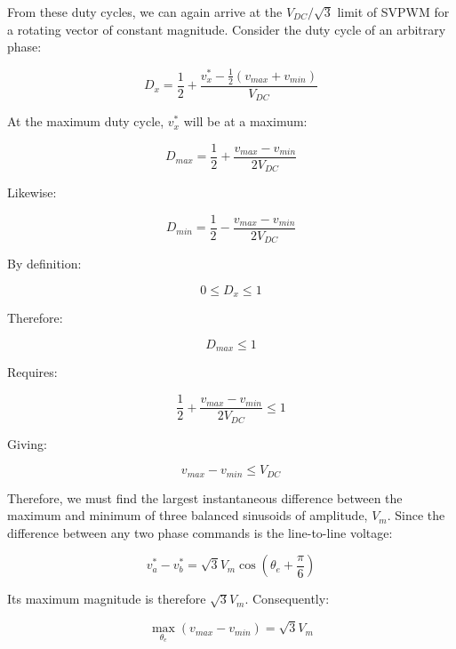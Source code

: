 \documentclass{article}
\begin{document}
From these duty cycles, we can again arrive at the $V_{DC}/\sqrt{3}$ limit of SVPWM for a rotating vector of constant magnitude. Consider the duty cycle of an arbitrary phase:

\begin{equation}
    D_x = \frac{1}{2} + \frac{v_x^* - \frac{1}{2}(v_{max} + v_{min})}{V_{DC}}
\end{equation}

At the maximum duty cycle, $v_x^*$ will be at a maximum:

\begin{equation}
    D_{max} = \frac{1}{2} + \frac{v_{max} - v_{min}}{2V_{DC}}
\end{equation}

Likewise:

\begin{equation}
    D_{min} = \frac{1}{2} - \frac{v_{max} - v_{min}}{2V_{DC}}
\end{equation}

By definition:

\begin{equation}
    0 \leq D_x \leq 1
\end{equation}

Therefore:

\begin{equation}
    D_{max} \leq 1
\end{equation}

Requires:

\begin{equation}
    \frac{1}{2} + \frac{v_{max} - v_{min}}{2V_{DC}} \leq 1
\end{equation}

Giving:

\begin{equation}
    v_{max} - v_{min} \leq V_{DC}
\end{equation}

Therefore, we must find the largest instantaneous difference between the maximum and minimum of three balanced sinusoids of amplitude, $V_m$. Since the difference between any two phase commands is the line-to-line voltage:

\begin{equation}
    v_a^* - v_b^* = \sqrt{3}V_m\cos(\theta_e + \frac{\pi}{6})
\end{equation}

Its maximum magnitude is therefore $\sqrt{3}V_m$. Consequently:

\[
    \underset{\theta_e}{\max}(v_{max} - v_{min}) = \sqrt{3}V_m
\]
\end{document}

